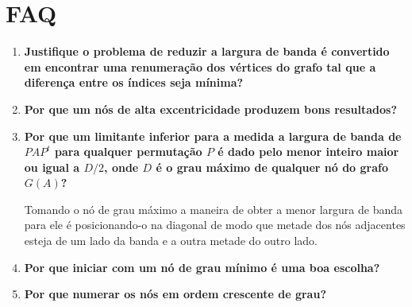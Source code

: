 % 
% 
% 

\section{FAQ}
\begin{enumerate}
    \item \textbf{Justifique o problema de reduzir a largura de banda é
        convertido em encontrar uma renumeração dos vértices do grafo tal que
        a diferença entre os índices seja mínima?}
        \cite{Fernanda:2005:ReordenacaoCCCG}

    \item \textbf{Por que um nós de alta excentricidade produzem bons
        resultados?} \cite{Fernanda:2005:ReordenacaoCCCG}

    \item \textbf{Por que um limitante inferior para a medida a largura de
        banda de $P A P^t$ para qualquer permutação $P$ é dado pelo menor
        inteiro maior ou igual a $D/2$, onde $D$ é o grau máximo de
        qualquer nó do grafo $G(A)$?} \cite{Cuthill:1969:ReducingBandwidth}

        Tomando o nó de grau máximo a maneira de obter a menor largura de
        banda para ele é posicionando-o na diagonal de modo que metade dos nós
        adjacentes esteja de um lado da banda e a outra metade do outro lado.

    \item \textbf{Por que iniciar com um nó de grau mínimo é uma boa escolha?}
        \cite{Cuthill:1969:ReducingBandwidth}

    \item \textbf{Por que numerar os nós em ordem crescente de grau?}
        \cite{Cuthill:1969:ReducingBandwidth}


\end{enumerate}

